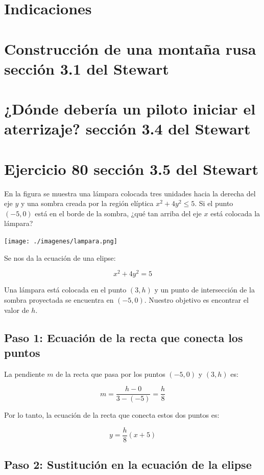 \documentclass[11pt,letterpaper]{article}
\begin{document}
\section*{Indicaciones}

\section*{Construcción de una montaña rusa sección 3.1 del Stewart }
\section*{¿Dónde debería un piloto iniciar el aterrizaje? sección 3.4 del Stewart }
\section*{Ejercicio 80 sección 3.5 del Stewart}

En la figura se muestra una lámpara colocada tres unidades hacia la derecha del eje \( y \) y una sombra creada por la región elíptica \( x^2 + 4y^2 \leq 5 \). Si el punto \( (-5, 0) \) está en el borde de la sombra, ¿qué tan arriba del eje \( x \) está colocada la lámpara?

\begin{center}
    \texttt{[image: ./imagenes/lampara.png]}
\end{center}

Se nos da la ecuación de una elipse:

\[
x^2 + 4y^2 = 5
\]

Una lámpara está colocada en el punto \( (3, h) \) y un punto de intersección de la sombra proyectada se encuentra en \( (-5, 0) \). Nuestro objetivo es encontrar el valor de \(h\).

\subsection{Paso 1: Ecuación de la recta que conecta los puntos}

La pendiente \(m\) de la recta que pasa por los puntos \( (-5, 0) \) y \( (3, h) \) es:

\[
m = \frac{h - 0}{3 - (-5)} = \frac{h}{8}
\]

Por lo tanto, la ecuación de la recta que conecta estos dos puntos es:

\[
y = \frac{h}{8}(x + 5)
\]

\subsection*{Paso 2: Sustitución en la ecuación de la elipse}
\end{document}
